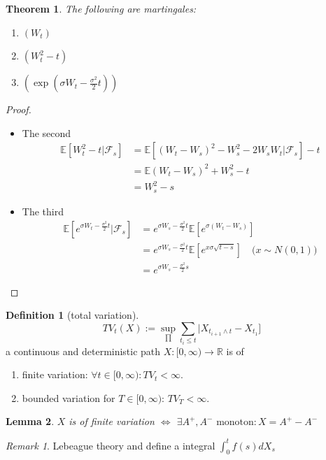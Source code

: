 \documentclass[a4paper,11pt]{book}
\newtheorem{theorem}{Theorem}[section]
\newtheorem{lemma}[theorem]{Lemma}
\theoremstyle{definition}
\newtheorem{definition}{Definition}[section]
\theoremstyle{remark}
\newtheorem*{remark}{Remark}
\begin{document}
\begin{theorem}
	 The following are martingales:
	 \begin{enumerate}
	 	\item $(W_t)$
	 	\item $(W_t^2 - t)$
	 	\item $\left(\exp(\sigma W_t - \frac{\sigma^2}{2}t)\right)$
	 \end{enumerate}
\end{theorem}
\begin{proof}\quad
	\begin{itemize}
		\item The second
		\begin{align*}
			\mathbb{E}[W_t^2 - t|\mathcal{F}_s] &= \mathbb{E}[(W_t - W_s)^2 - W_s^2 - 2W_sW_t|\mathcal{F}_s] - t\\
			&= \mathbb{E}(W_t-W_s)^2 + W_s^2 - t\\
			&= W_s^2 - s
		\end{align*}
		 
		\item The third
		\begin{align*}
			\mathbb{E}[e^{\sigma W_t - \frac{\sigma^2}{2}t} |\mathcal{F}_s] &= e^{\sigma W_s - \frac{\sigma^2}{2}t}\mathbb{E}[e^{\sigma(W_t - W_s)}]\\
			&= e^{\sigma W_s - \frac{\sigma^2}{2}t}\mathbb{E}[e^{x\sigma \sqrt{t-s}}] \quad \text{($x \sim N(0, 1)$)}\\
			&= e^{\sigma W_s - \frac{\sigma^2}{2}s}
		\end{align*}
	\end{itemize}
\end{proof}


\begin{definition}[total variation]
	\begin{equation*}
		TV_t(X) := \sup_{\prod}\sum_{t_i \leq t}|X_{t_{i+1} \wedge t} - X_{t_1}]
	\end{equation*}
	a continuous and deterministic path $X: [0, \infty) \rightarrow \mathbb{R}$ is of 
	\begin{enumerate}
		\item  finite variation: $\forall t \in [0, \infty): TV_t < \infty$.
		\item bounded variation for $T \in [0, \infty)$: $TV_T < \infty$. 
	\end{enumerate}
\end{definition}

\begin{lemma}
	$X$ is of finite variation $\Leftrightarrow$ $\exists A^+, A^- \text{ monoton}: X = A^+ - A^-$
\end{lemma}
\begin{remark}
Lebeague theory and define a integral $\int_0^t f(s) dX_s $	
\end{remark}
\end{document}
